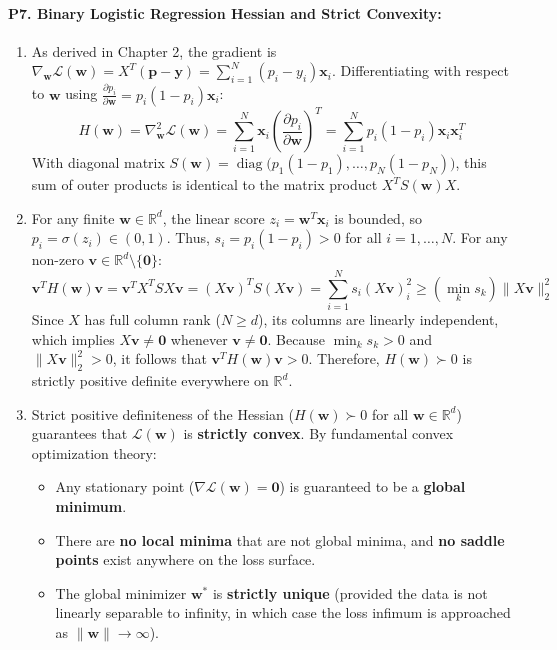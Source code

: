 \paragraph{P7. Binary Logistic Regression Hessian and Strict Convexity:}
\begin{enumerate}[label=(\alph*)]
    \item As derived in Chapter 2, the gradient is $\nabla_{\mathbf{w}} \mathcal{L}(\mathbf{w}) = X^T(\mathbf{p} - \mathbf{y}) = \sum_{i=1}^N (p_i - y_i)\mathbf{x}_i$. Differentiating with respect to $\mathbf{w}$ using $\frac{\partial p_i}{\partial \mathbf{w}} = p_i(1 - p_i)\mathbf{x}_i$:
    \begin{equation*}
    H(\mathbf{w}) = \nabla^2_{\mathbf{w}}\mathcal{L}(\mathbf{w}) = \sum_{i=1}^N \mathbf{x}_i \left( \frac{\partial p_i}{\partial \mathbf{w}} \right)^T = \sum_{i=1}^N p_i(1 - p_i) \mathbf{x}_i \mathbf{x}_i^T
    \end{equation*}
    With diagonal matrix $S(\mathbf{w}) = \operatorname{diag}\big(p_1(1-p_1), \dots, p_N(1-p_N)\big)$, this sum of outer products is identical to the matrix product $X^T S(\mathbf{w}) X$.
    
    \item For any finite $\mathbf{w} \in \mathbb{R}^d$, the linear score $z_i = \mathbf{w}^T \mathbf{x}_i$ is bounded, so $p_i = \sigma(z_i) \in (0, 1)$. Thus, $s_i = p_i(1 - p_i) > 0$ for all $i = 1, \dots, N$.
    For any non-zero $\mathbf{v} \in \mathbb{R}^d \setminus \{\mathbf{0}\}$:
    \begin{equation*}
    \mathbf{v}^T H(\mathbf{w}) \mathbf{v} = \mathbf{v}^T X^T S X \mathbf{v} = (X\mathbf{v})^T S (X\mathbf{v}) = \sum_{i=1}^N s_i (X\mathbf{v})_i^2 \ge \left( \min_{k} s_k \right) \|X\mathbf{v}\|_2^2
    \end{equation*}
    Since $X$ has full column rank ($N \ge d$), its columns are linearly independent, which implies $X\mathbf{v} \ne \mathbf{0}$ whenever $\mathbf{v} \ne \mathbf{0}$.
    Because $\min_k s_k > 0$ and $\|X\mathbf{v}\|_2^2 > 0$, it follows that $\mathbf{v}^T H(\mathbf{w}) \mathbf{v} > 0$. Therefore, $H(\mathbf{w}) \succ 0$ is strictly positive definite everywhere on $\mathbb{R}^d$.
    
    \item Strict positive definiteness of the Hessian ($H(\mathbf{w}) \succ 0$ for all $\mathbf{w} \in \mathbb{R}^d$) guarantees that $\mathcal{L}(\mathbf{w})$ is \textbf{strictly convex}.
    By fundamental convex optimization theory:
    \begin{itemize}
        \item Any stationary point ($\nabla \mathcal{L}(\mathbf{w}) = \mathbf{0}$) is guaranteed to be a \textbf{global minimum}.
        \item There are \textbf{no local minima} that are not global minima, and \textbf{no saddle points} exist anywhere on the loss surface.
        \item The global minimizer $\mathbf{w}^*$ is \textbf{strictly unique} (provided the data is not linearly separable to infinity, in which case the loss infimum is approached as $\|\mathbf{w}\| \to \infty$).
    \end{itemize}
\end{enumerate}

